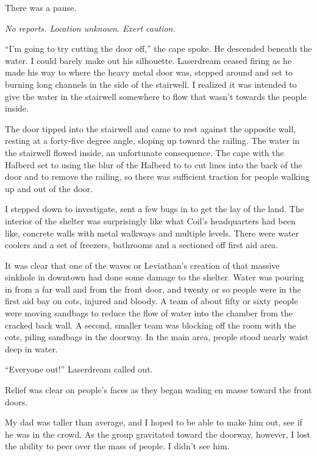 There was a pause.



\emph{No reports.  Location unknown.  Exert caution.}



``I'm going to try cutting the door off,'' the cape spoke.  He descended beneath the water.  I could barely make out his silhouette.  Laserdream ceased firing as he made his way to where the heavy metal door was, stepped around and set to burning long channels in the side of the stairwell.  I realized it was intended to give the water in the stairwell somewhere to flow that wasn't towards the people inside.



The door tipped into the stairwell and came to rest against the opposite wall, resting at a forty-five degree angle, sloping up toward the railing.  The water in the stairwell flowed inside, an unfortunate consequence.  The cape with the Halberd set to using the blur of the Halberd to to cut lines into the back of the door and to remove the railing, so there was sufficient traction for people walking up and out of the door.



I stepped down to investigate, sent a few bugs in to get the lay of the land.  The interior of the shelter was surprisingly like what Coil's headquarters had been like, concrete walls with metal walkways and multiple levels.  There were water coolers and a set of freezers, bathrooms and a sectioned off first aid area.



It was clear that one of the waves or Leviathan's creation of that massive sinkhole in downtown had done some damage to the shelter.  Water was pouring in from a far wall and from the front door, and twenty or so people were in the first aid bay on cots, injured and bloody.  A team of about fifty or sixty people were moving sandbags to reduce the flow of water into the chamber from the cracked back wall.  A second, smaller team was blocking off the room with the cots, piling sandbags in the doorway.  In the main area, people stood nearly waist deep in water.



``Everyone out!'' Laserdream called out.



Relief was clear on people's faces as they began wading en masse toward the front doors.



My dad was taller than average, and I hoped to be able to make him out, see if he was in the crowd.  As the group gravitated toward the doorway, however, I lost the ability to peer over the mass of people.  I didn't see him.



